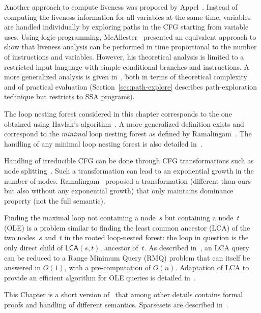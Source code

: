 Another approach to compute liveness was proposed by
Appel~\cite[p.~429]{appel:2002:modern}. Instead of computing the liveness
information for all variables at the same time, variables are handled
individually by exploring paths in the CFG starting from variable uses. 
Using logic programming, McAllester~\cite{M02} presented an equivalent approach to show that liveness analysis can be performed in time
proportional to the number of instructions and variables.
However, his theoretical analysis is limited to a restricted input language
with simple conditional branches and instructions.
A more generalized analysis is given in~\cite{LivenessTACO}, both in terms of theoretical complexity and of practical evaluation (Section~\ref{sec:path-explore} describes path-exploration technique but restricts to SSA programs).

The loop nesting forest considered in this chapter corresponds to the one obtained using Havlak's algorithm~\cite{havlak:loop}.
A more generalized definition exists and correspond to the \emph{minimal} loop nesting forest as defined by Ramalingam~\cite{Ramalingam02:Loops}.
The handling of any minimal loop nesting forest is also detailed in~\cite{LivenessTACO}.

Handling of irreducible CFG can be done through CFG transformations such as node splitting~\cite{JC97,aho86compilers}.
Such a transformation can lead to an exponential growth in the number of nodes.
Ramalingam~\cite{Ramalingam02:Loops} proposed a transformation (different than ours but also without any exponential growth) that only maintains dominance property (not the full semantic).

Finding the maximal loop not containing a node~$s$ but containing a node~$t$ (OLE) is a problem similar to finding the least common ancestor (LCA) of the two nodes~$s$ and~$t$ in the rooted loop-nested forest:
the loop in question is the only direct child of $\textsf{LCA}(s,t)$, ancestor of~$t$.
As described in~\cite{BenderFC00}, an LCA query can be reduced to a Range Minimum Query (RMQ) problem that can itself be answered in $O(1)$, with a pre-computation of $O(n)$.
Adaptation of LCA to provide an efficient algorithm for OLE queries is detailed in~\cite{LivenessTACO}.

This Chapter is a short version of~\cite{LivenessTACO} that among other details contains formal proofs and handling of different \phifun semantics. Sparsesets are described in~\cite{cooper:2004:engineering}.

